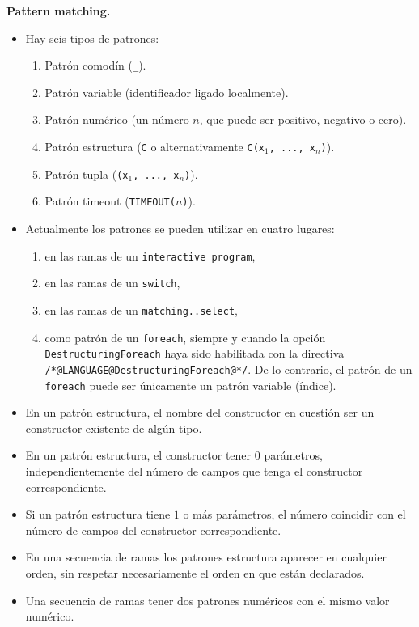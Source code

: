 \documentclass{article}
\begin{document}
{\bf Pattern matching.}
\begin{itemize}
\item Hay seis tipos de patrones:
  \begin{enumerate}
  \item Patr\'on comod\'in (\texttt{\_}).
  \item Patr\'on variable (identificador ligado localmente).
  \item Patr\'on num\'erico (un n\'umero $n$, que puede ser positivo, negativo o cero).
  \item Patr\'on estructura (\texttt{C} o alternativamente \texttt{C(x$_1$, ..., x$_n$)}).
  \item Patr\'on tupla (\texttt{(x$_1$, ..., x$_n$)}).
  \item Patr\'on timeout (\texttt{TIMEOUT($n$)}).
  \end{enumerate}
\item Actualmente los patrones se pueden utilizar en cuatro lugares:
      \begin{enumerate}
      \item en las ramas de un \texttt{interactive program},
      \item en las ramas de un \texttt{switch},
      \item en las ramas de un \texttt{matching..select},
      \item como patr\'on de un \texttt{foreach},
            siempre y cuando la opci\'on \texttt{DestructuringForeach}
            haya sido habilitada con la directiva \texttt{/*@LANGUAGE@DestructuringForeach@*/}.
            De lo contrario, el patr\'on de un \texttt{foreach}
            puede ser \'unicamente un patr\'on variable (\'indice).
      \end{enumerate}
\item En un patr\'on estructura, el nombre del constructor en cuesti\'on \DEBE ser un constructor existente de
      alg\'un tipo.
\item En un patr\'on estructura, el constructor \PUEDE tener $0$ par\'ametros, independientemente del n\'umero
      de campos que tenga el constructor correspondiente.
\item Si un patr\'on estructura tiene $1$ o m\'as par\'ametros, el n\'umero \DEBE coincidir con el n\'umero
      de campos del constructor correspondiente.
\item En una secuencia de ramas los patrones estructura \PUEDEN aparecer en cualquier orden, sin respetar necesariamente el orden en que est\'an declarados.
\item Una secuencia de ramas \NOPUEDE tener dos patrones num\'ericos con el mismo valor num\'erico.

\end{itemize}
\end{document}
